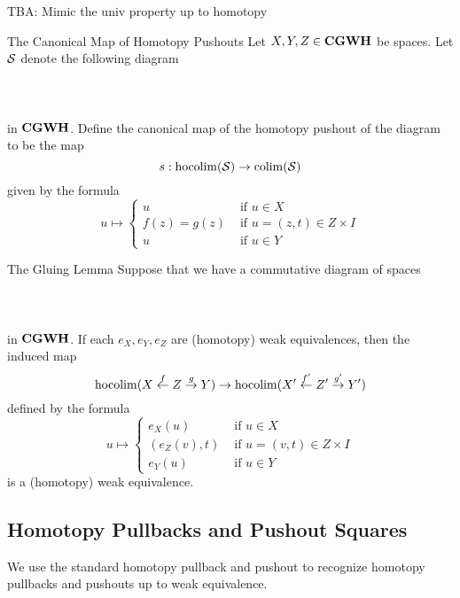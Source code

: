 \documentclass[a4paper]{article}
\begin{document}
TBA: Mimic the univ property up to homotopy

\begin{defn}{The Canonical Map of Homotopy Pushouts}{} Let $X,Y,Z\in\bold{CGWH}$ be spaces. Let $\mathcal{S}$ denote the following diagram \\~\\
\\~\\
in $\bold{CGWH}$. Define the canonical map of the homotopy pushout of the diagram to be the map $$s:\operatorname*{hocolim}(\mathcal{S})\to\operatorname*{colim}(\mathcal{S})$$ given by the formula $$u\mapsto\begin{cases}
u & \text{ if }u\in X\\
f(z)=g(z) & \text{ if }u=(z,t)\in Z\times I\\
u & \text{ if }u\in Y
\end{cases}$$
\end{defn}

\begin{thm}{The Gluing Lemma}{} Suppose that we have a commutative diagram of spaces \\~\\
\\~\\
in $\bold{CGWH}$. If each $e_X,e_Y,e_Z$ are (homotopy) weak equivalences, then the induced map $$\operatorname*{hocolim}(X\overset{f}{\leftarrow}Z\overset{g}{\rightarrow}Y)\to\operatorname*{hocolim}(X'\overset{f'}{\leftarrow}Z'\overset{g'}{\rightarrow}Y')$$ defined by the formula $$u\mapsto\begin{cases}
e_X(u) & \text{ if }u\in X\\
(e_Z(v),t) & \text{ if }u=(v,t)\in Z\times I\\
e_Y(u) & \text{ if }u\in Y
\end{cases}$$ is a (homotopy) weak equivalence. 
\end{thm}

\subsection{Homotopy Pullbacks and Pushout Squares}
We use the standard homotopy pullback and pushout to recognize homotopy pullbacks and pushouts up to weak equivalence. 
\end{document}
